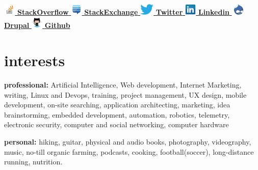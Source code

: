 \documentclass[]{friggeri-cv} %
\begin{document}
	
    \href{http://stackoverflow.com/users/1106420/frazras}{\includegraphics[height=16pt]{stackoverflow.png}  \textbf{StackOverflow }}
    \href{http://stackexchange.com/users/530574/frazras?tab=accounts}{\includegraphics[height=16pt]{stackexchange.png}  \textbf{StackExchange }}
    \href{http://twitter.com/frazras}{\includegraphics[height=16pt]{twitter.eps}  \textbf{Twitter }}
    \href{http://jm.linkedin.com/in/rohansmith}{\includegraphics[height=16pt]{linkedin.png}  \textbf{Linkedin }}
    \href{http://drupal.org/user/34622}{\includegraphics[height=16pt]{druplicon.png}  \textbf{Drupal }} \href{https://github.com/frazras}{\includegraphics[height=16pt]{octocat.png}  \textbf{Github }}

\section{interests}

\textbf{professional:} Artificial Intelligence, Web development, Internet Marketing, writing, Linux and Devops, training, project management, UX design, mobile development, on-site searching, application architecting, marketing, idea brainstorming, embedded development, automation, robotics, telemetry, electronic security, computer and social networking, computer hardware

\textbf{personal:} hiking, guitar, physical and audio books, photography, videography, music, no-till organic farming, podcasts, cooking, football(soccer), long-distance running, nutrition.

\end{document}
